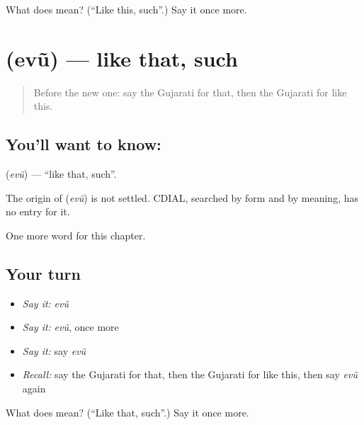 \begin{tcolorbox}[breakable,colback=teal!4,colframe=teal!35!black,title={Before you move on}]
What does  mean? (\textquotedblleft{}Like this, such\textquotedblright{}.) Say it once more.
\end{tcolorbox}
\section[\texorpdfstring{\gu{એવું} (evũ)}{એવું (evũ)}]{ (evũ) — like that, such}

\label{lesson:GU-C99-evu}



\begin{quote}
Before the new one: say the Gujarati for that, then the Gujarati for like this.
\end{quote}

\subsection*{You'll want to know: }
\textbf{} (\emph{evũ}) — \textquotedblleft{}like that, such\textquotedblright{}.

\begin{cousinweb}
The origin of \textbf{} (\emph{evũ}) is not settled. CDIAL, searched by form and by meaning, has no entry for it.
\end{cousinweb}

\begin{grammarlens}[title={What you've built}]
One more word for this chapter.
\end{grammarlens}

\subsection*{Your turn}
\begin{itemize}
\raggedright
  \item \emph{Say it:} \emph{evũ}
  \item \emph{Say it:} \emph{evũ}, once more
  \item \emph{Say it:} say \emph{evũ}
  \item \emph{Recall:} say the Gujarati for that, then the Gujarati for like this, then say \emph{evũ} again
\end{itemize}

\begin{tcolorbox}[breakable,colback=teal!4,colframe=teal!35!black,title={Before you move on}]
What does  mean? (\textquotedblleft{}Like that, such\textquotedblright{}.) Say it once more.
\end{tcolorbox}
